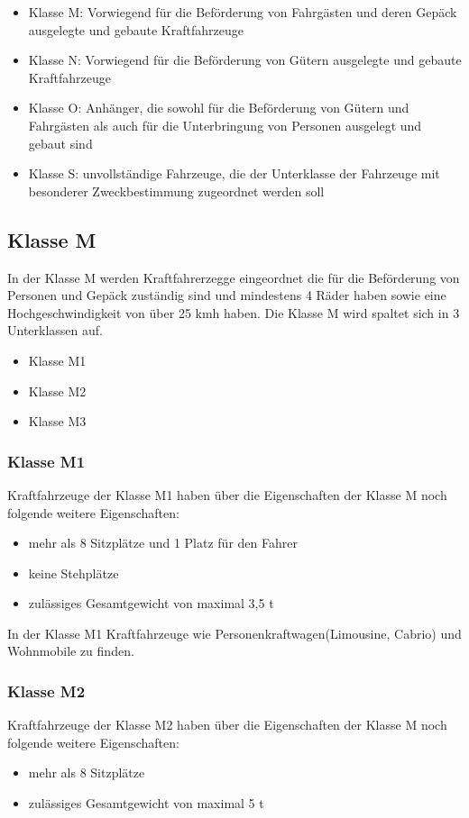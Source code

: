 \begin{itemize}
	\item Klasse M: Vorwiegend für die Beförderung von Fahrgästen und deren Gepäck ausgelegte und gebaute Kraftfahrzeuge
	\item Klasse N: Vorwiegend für die Beförderung von Gütern ausgelegte und gebaute Kraftfahrzeuge
	\item Klasse O: Anhänger, die sowohl für die Beförderung von Gütern und Fahrgästen als auch für die Unterbringung von Personen ausgelegt und gebaut sind
	\item Klasse S: unvollständige Fahrzeuge, die der Unterklasse der Fahrzeuge mit besonderer Zweckbestimmung zugeordnet werden soll
\end{itemize}

\subsection{Klasse M}
In der Klasse M werden Kraftfahrerzegge eingeordnet die für die Beförderung von Personen und Gepäck zuständig sind und mindestens 4 Räder haben sowie eine Hochgeschwindigkeit von über 25 \ac{kmh} haben.
\newline
Die Klasse M wird spaltet sich in 3 Unterklassen auf.
\begin{itemize}
	\item {Klasse M1}
	\item {Klasse M2}
	\item {Klasse M3}
\end{itemize}
\subsubsection{Klasse M1}
Kraftfahrzeuge der Klasse M1 haben über die Eigenschaften der Klasse M noch folgende weitere Eigenschaften:
\begin{itemize}
	\item {mehr als 8 Sitzplätze und 1 Platz für den Fahrer}
	\item {keine Stehplätze}
	\item {zulässiges Gesamtgewicht von maximal 3,5 \ac{t}}
\end{itemize}

In der Klasse M1 Kraftfahrzeuge wie Personenkraftwagen(Limousine, Cabrio) und Wohnmobile zu finden.

\subsubsection{Klasse M2}
Kraftfahrzeuge der Klasse M2 haben über die Eigenschaften der Klasse M noch folgende weitere Eigenschaften:
\begin{itemize}
	\item {mehr als 8 Sitzplätze}
	\item {zulässiges Gesamtgewicht von maximal 5 \ac{t}}
\end{itemize}

